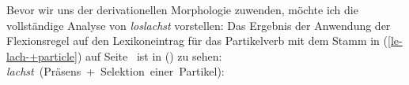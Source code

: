 Bevor wir uns der derivationellen Morphologie zuwenden, möchte ich die vollständige
Analyse von \emph{loslachst} vorstellen:
Das Ergebnis der Anwendung der Flexionsregel auf den Lexikoneintrag
für das Partikelverb mit dem Stamm 
in (\ref{le-lach-+particle}) auf Seite~\pageref{le-lach-+particle} ist in () zu sehen:
%
\eas
\label{le-lachst-+particle}%
\mbox{\emph{lachst} (Präsens + Selektion einer Partikel):}\\
\zs

